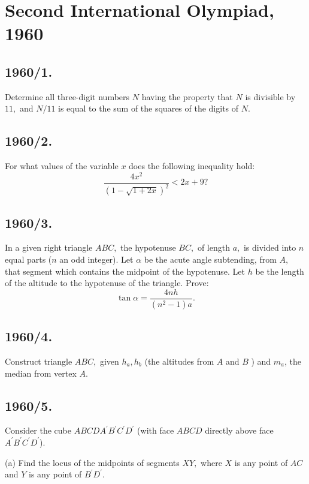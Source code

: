 \documentclass[12pt,thmsa]{article}
\begin{document}
\section{Second International Olympiad, 1960}

\subsection{1960/1.}

Determine all three-digit numbers $N$ having the property that $N$ is
divisible by $11,$ and $N/11$ is equal to the sum of the squares of the
digits of $N.$

\subsection{1960/2.}

For what values of the variable $x$ does the following inequality hold:
\[
\frac{4x^{2}}{(1-\sqrt{1+2x})^{2}}<2x+9?
\]

\subsection{1960/3.}

In a given right triangle $ABC,$ the hypotenuse $BC,$ of length $a,$ is
divided into $n$ equal parts ($n$ an odd integer). Let $\alpha $ be the
acute angle subtending, from $A,$ that segment which contains the midpoint
of the hypotenuse. Let $h$ be the length of the altitude to the hypotenuse
of the triangle. Prove:
\[
\tan \alpha =\frac{4nh}{(n^{2}-1)a}.
\]

\subsection{1960/4.}

Construct triangle $ABC,$ given $h_{a},h_{b}$ (the altitudes from $A$ and $B$%
) and $m_{a}$, the median from vertex $A.$

\subsection{1960/5.}

Consider the cube $ABCDA^{\prime }B^{\prime }C^{\prime }D^{\prime }$ (with
face $ABCD$ directly above face $A^{\prime }B^{\prime }C^{\prime }D^{\prime }
$).

(a) Find the locus of the midpoints of segments $XY,$ where $X$ is any point
of $AC$ and $Y$ is any point of $B^{\prime }D^{\prime }.$
\end{document}

